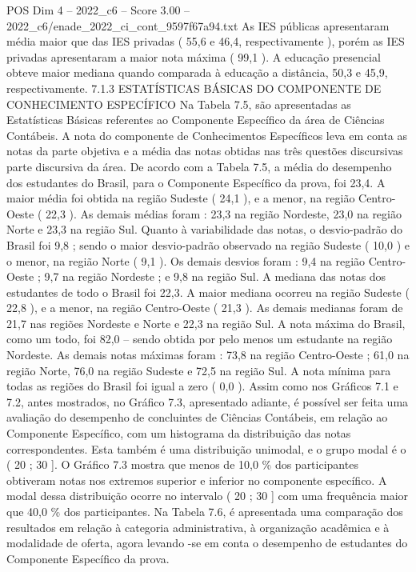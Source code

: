 \begin{textsample}{POS Dim 4 – 2022\_c6 – Score 3.00 – 2022\_c6/enade\_2022\_ci\_cont\_9597f67a94.txt}
As IES públicas apresentaram média maior que das IES privadas ( 55,6 e 46,4, respectivamente ), porém as IES privadas apresentaram a maior nota máxima ( 99,1 ).
A educação presencial obteve maior mediana quando comparada à educação a distância, 50,3 e 45,9, respectivamente. 7.1.3 ESTATÍSTICAS BÁSICAS DO COMPONENTE DE CONHECIMENTO ESPECÍFICO Na Tabela 7.5, são apresentadas as Estatísticas Básicas referentes ao Componente Específico da área de Ciências Contábeis.
A nota do componente de Conhecimentos Específicos leva em conta as notas da parte objetiva e a média das notas obtidas nas três questões discursivas parte discursiva da área.
De acordo com a Tabela 7.5, a média do desempenho dos estudantes do Brasil, para o Componente Específico da prova, foi 23,4.
A maior média foi obtida na região Sudeste ( 24,1 ), e a menor, na região Centro-Oeste ( 22,3 ).
As demais médias foram : 23,3 na região Nordeste, 23,0 na região Norte e 23,3 na região Sul.
Quanto à variabilidade das notas, o desvio-padrão do Brasil foi 9,8 ; sendo o maior desvio-padrão observado na região Sudeste ( 10,0 ) e o menor, na região Norte ( 9,1 ).
Os demais desvios foram : 9,4 na região Centro-Oeste ; 9,7 na região Nordeste ; e 9,8 na região Sul.
A mediana das notas dos estudantes de todo o Brasil foi 22,3.
A maior mediana ocorreu na região Sudeste ( 22,8 ), e a menor, na região Centro-Oeste ( 21,3 ).
As demais medianas foram de 21,7 nas regiões Nordeste e Norte e 22,3 na região Sul.
A nota máxima do Brasil, como um todo, foi 82,0 – sendo obtida por pelo menos um estudante na região Nordeste.
As demais notas máximas foram : 73,8 na região Centro-Oeste ; 61,0 na região Norte, 76,0 na região Sudeste e 72,5 na região Sul.
A nota mínima para todas as regiões do Brasil foi igual a zero ( 0,0 ).
Assim como nos Gráficos 7.1 e 7.2, antes mostrados, no Gráfico 7.3, apresentado adiante, é possível ser feita uma avaliação do desempenho de concluintes de Ciências Contábeis, em relação ao Componente Específico, com um histograma da distribuição das notas correspondentes.
Esta também é uma distribuição unimodal, e o grupo modal é o ( 20 ; 30 ].
O Gráfico 7.3 mostra que menos de 10,0 \% dos participantes obtiveram notas nos extremos superior e inferior no componente específico.
A modal dessa distribuição ocorre no intervalo ( 20 ; 30 ] com uma frequência maior que 40,0 \% dos participantes.
Na Tabela 7.6, é apresentada uma comparação dos resultados em relação à categoria administrativa, à organização acadêmica e à modalidade de oferta, agora levando -se em conta o desempenho de estudantes do Componente Específico da prova.

\end{textsample}
